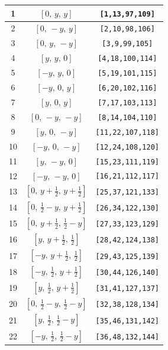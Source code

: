 \documentclass[fleqn,8pt]{jsarticle}
\begin{document}
\begin{longtable}{ccc}
1 & $\left[ 0,\, y,\, y \right]$ & {\tt [1,13,97,109]} \\ \hline
2 & $\left[ 0,\, - y,\, y \right]$ & {\tt [2,10,98,106]} \\ \hline
3 & $\left[ 0,\, y,\, - y \right]$ & {\tt [3,9,99,105]} \\ \hline
4 & $\left[ y,\, y,\, 0 \right]$ & {\tt [4,18,100,114]} \\ \hline
5 & $\left[ - y,\, y,\, 0 \right]$ & {\tt [5,19,101,115]} \\ \hline
6 & $\left[ - y,\, 0,\, y \right]$ & {\tt [6,20,102,116]} \\ \hline
7 & $\left[ y,\, 0,\, y \right]$ & {\tt [7,17,103,113]} \\ \hline
8 & $\left[ 0,\, - y,\, - y \right]$ & {\tt [8,14,104,110]} \\ \hline
9 & $\left[ y,\, 0,\, - y \right]$ & {\tt [11,22,107,118]} \\ \hline
10 & $\left[ - y,\, 0,\, - y \right]$ & {\tt [12,24,108,120]} \\ \hline
11 & $\left[ y,\, - y,\, 0 \right]$ & {\tt [15,23,111,119]} \\ \hline
12 & $\left[ - y,\, - y,\, 0 \right]$ & {\tt [16,21,112,117]} \\ \hline
13 & $\left[ 0,\, y + \frac{1}{2},\, y + \frac{1}{2} \right]$ & {\tt [25,37,121,133]} \\ \hline
14 & $\left[ 0,\, \frac{1}{2} - y,\, y + \frac{1}{2} \right]$ & {\tt [26,34,122,130]} \\ \hline
15 & $\left[ 0,\, y + \frac{1}{2},\, \frac{1}{2} - y \right]$ & {\tt [27,33,123,129]} \\ \hline
16 & $\left[ y,\, y + \frac{1}{2},\, \frac{1}{2} \right]$ & {\tt [28,42,124,138]} \\ \hline
17 & $\left[ - y,\, y + \frac{1}{2},\, \frac{1}{2} \right]$ & {\tt [29,43,125,139]} \\ \hline
18 & $\left[ - y,\, \frac{1}{2},\, y + \frac{1}{2} \right]$ & {\tt [30,44,126,140]} \\ \hline
19 & $\left[ y,\, \frac{1}{2},\, y + \frac{1}{2} \right]$ & {\tt [31,41,127,137]} \\ \hline
20 & $\left[ 0,\, \frac{1}{2} - y,\, \frac{1}{2} - y \right]$ & {\tt [32,38,128,134]} \\ \hline
21 & $\left[ y,\, \frac{1}{2},\, \frac{1}{2} - y \right]$ & {\tt [35,46,131,142]} \\ \hline
22 & $\left[ - y,\, \frac{1}{2},\, \frac{1}{2} - y \right]$ & {\tt [36,48,132,144]} \\ \hline

\end{longtable}
\end{document}
